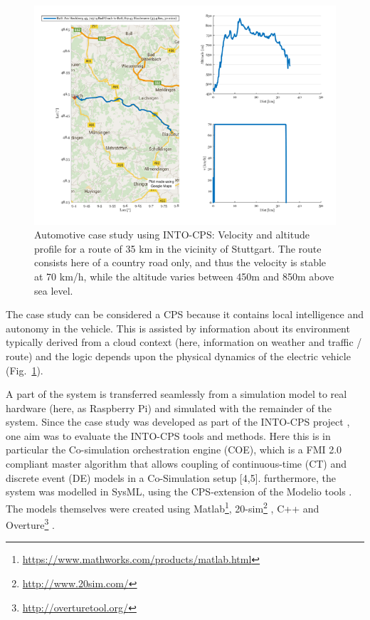 \begin{figure}[!ht]
	\centering
		\includegraphics[width=0.9 \textwidth]{./figures/auto}
	\caption{Automotive case study using INTO-CPS: Velocity and altitude profile for a route of 35 km in the vicinity of Stuttgart. The route consists here of a country road only, and thus the velocity is stable at 70 km/h, while the altitude varies between 450m and 850m above sea level.}
	\label{fig:auto}
\end{figure}

The case study can be considered a CPS because it contains local intelligence and autonomy in the vehicle. This is assisted by information about its environment typically derived from a cloud context (here, information on weather and traffic / route) and the logic depends upon the physical dynamics of the electric vehicle (Fig.~\ref{fig:auto}). 

A part of the system is transferred seamlessly from a simulation model to real hardware (here, as Raspberry Pi) and simulated with the remainder of the system. Since the case study was developed as part of the INTO-CPS project \cite{Fitzgerald&15,Larsen&16a,Larsen&16c,Larsen&16e,Larsen&17a}, one aim was to evaluate the INTO-CPS tools and methods. Here this is in particular the Co-simulation orchestration engine (COE), which is a FMI 2.0 compliant master algorithm that allows coupling of continuous-time (CT) and discrete event (DE) models in a Co-Simulation setup [4,5].  furthermore, the system was modelled in SysML, using the CPS-extension of the Modelio tools \cite{Bagnato&15}. The models themselves were created using Matlab\footnote{\url{https://www.mathworks.com/products/matlab.html}}, 20-sim\footnote{\url{http://www.20sim.com/}} \cite{Kleijn06}, C++ and Overture\footnote{\url{http://overturetool.org/}} \cite{Larsen&10a}.


